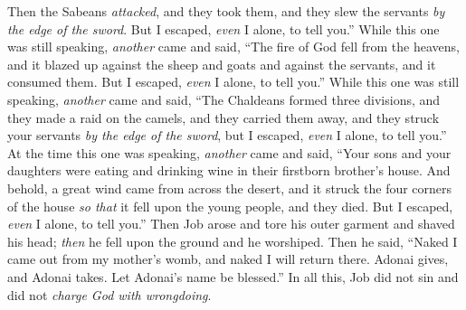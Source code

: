 \begin{biblechapter}
\verse Then the Sabeans \textit{attacked}, and they took them, and they slew the servants \textit{by the edge of the sword}. But I escaped, \textit{even} I alone, to tell you.”
\verse While this one was still speaking, \textit{another} came and said, “The fire of God fell from the heavens, and it blazed up against the sheep and goats and against the servants, and it consumed them. But I escaped, \textit{even} I alone, to tell you.”
\verse While this one was still speaking, \textit{another} came and said, “The Chaldeans formed three divisions, and they made a raid on the camels, and they carried them away, and they struck your servants \textit{by the edge of the sword}, but I escaped, \textit{even} I alone, to tell you.”
\verse At the time this one was speaking, \textit{another} came and said, “Your sons and your daughters were eating and drinking wine in their firstborn brother’s house.
\verse And behold, a great wind came from across the desert, and it struck the four corners of the house \textit{so that} it fell upon the young people, and they died. But I escaped, \textit{even} I alone, to tell you.”
\verse Then Job arose and tore his outer garment and shaved his head; \textit{then} he fell upon the ground and he worshiped.
\verse Then he said, “Naked I came out from my mother’s womb, and naked I will return there. Adonai gives, and Adonai takes. Let Adonai’s name be blessed.”
\verse In all this, Job did not sin and did not \textit{charge God with wrongdoing}.
\end{biblechapter}

